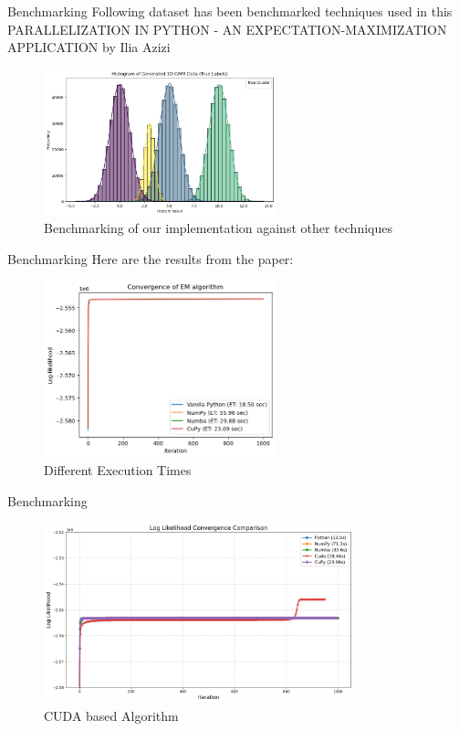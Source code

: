 \documentclass{beamer}
\begin{document}
\begin{frame}{Benchmarking}
    Following dataset has been benchmarked techniques used in this PARALLELIZATION IN PYTHON - AN
    EXPECTATION-MAXIMIZATION APPLICATION by Ilia Azizi

    \begin{figure}
        \centering
        \includegraphics[width=0.6\textwidth]{images/dataset.png}  %
        \caption{Benchmarking of our implementation against other techniques}
    \end{figure}

\end{frame}

\begin{frame}{Benchmarking}
    Here are the results from the paper:
    \begin{figure}
        \centering
        \includegraphics[width=0.6\textwidth]{images/graph1.png}  %
        \caption{Different Execution Times}
    \end{figure}
\end{frame}

\begin{frame}{Benchmarking}

    \begin{figure}
        \centering
        \includegraphics[width=0.8\textwidth]{images/graph22.png}
        \caption{CUDA based Algorithm}
    \end{figure}
\end{frame}
\end{document}
